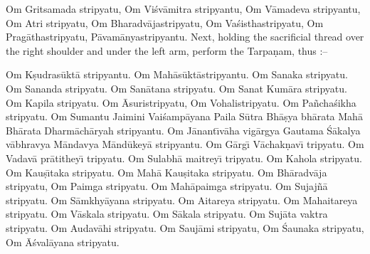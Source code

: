 Om Gritsamada stripyatu, Om Vi\'sv\=amitra stripyantu, Om V\=amadeva stripyantu, Om Atri stripyatu, Om Bharadv\=ajastripyatu, Om Va\'sisthastripyatu, Om Prag\=athastripyatu, P\=avam\=anyastripyantu. Next, holding the sacrificial thread over the right shoulder and under the left arm, perform the Tarpa\d{n}am, thus :--

Om K\d{s}udras\=ukt\=a stripyantu.
Om Mah\=as\=ukt\=astripyantu.
Om Sanaka stripyatu.
Om Sananda stripyatu.
Om San\=atana stripyatu.
Om Sanat Kum\=ara stripyatu.
Om Kapila stripyatu.
Om \=Asuristripyatu,
Om Vohalistripyatu.
Om Pa\~ncha\'sikha stripyatu.
Om Sumantu Jaimini Vai\'samp\=ayana Paila S\=utra Bh\=a\d{s}ya bh\=arata Mah\=a Bh\=arata Dharm\=ach\=aryah stripyantu.
Om J\=anant\={\i}v\=aha vig\=argya Gautama \'S\=akalya v\=abhravya M\=andavya M\=and\=ukey\=a stripyantu.
Om G\=arg\={\i} V\=achak\d{n}av\={\i} tripyatu.
Om Vadav\=a pr\=atithey\={\i} tripyatu.
Om Sulabh\=a maitrey\={\i} tripyatu.
Om Kahola stripyatu.
Om Kau\d{s}\={\i}taka stripyatu.
Om Mah\=a Kau\d{s}itaka stripyatu.
Om Bh\=aradv\=aja stripyatu,
Om Paimga stripyatu.
Om Mah\=apaimga stripyatu.
Om Sujaj\~n\=a stripyatu.
Om S\=amkhy\=ayana stripyatu.
Om Aitareya stripyatu.
Om Mahaitareya stripyatu.
Om V\=askala stripyatu.
Om S\=akala stripyatu.
Om Suj\=ata vaktra stripyatu.
Om Audav\=ahi stripyatu.
Om Sauj\=ami stripyatu,
Om \'Saunaka stripyatu,
Om \=A\'sval\=ayana stripyatu.


